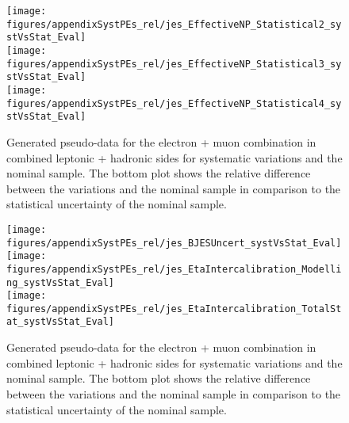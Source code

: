 \begin{figure}[!hb]
\begin{center}
        \texttt{[image: figures/appendixSystPEs\_rel/jes\_EffectiveNP\_Statistical2\_systVsStat\_Eval]}\\
        \texttt{[image: figures/appendixSystPEs\_rel/jes\_EffectiveNP\_Statistical3\_systVsStat\_Eval]}\\
        \texttt{[image: figures/appendixSystPEs\_rel/jes\_EffectiveNP\_Statistical4\_systVsStat\_Eval]}
\caption{Generated pseudo-data for the electron + muon combination in combined leptonic + hadronic sides for systematic variations and the nominal \ttbar sample. The bottom plot shows the relative difference between the variations and the nominal sample in comparison to the statistical uncertainty of the nominal sample.}   
\label{fig:systematicVar_lephad_JES_3_2}
\end{center}
\end{figure}        
\begin{figure}[!hb]
\begin{center}
        \texttt{[image: figures/appendixSystPEs\_rel/jes\_BJESUncert\_systVsStat\_Eval]}\\
        \texttt{[image: figures/appendixSystPEs\_rel/jes\_EtaIntercalibration\_Modelling\_systVsStat\_Eval]}\\
        \texttt{[image: figures/appendixSystPEs\_rel/jes\_EtaIntercalibration\_TotalStat\_systVsStat\_Eval]}
\caption{Generated pseudo-data for the electron + muon combination in combined leptonic + hadronic sides for systematic variations and the nominal \ttbar sample. The bottom plot shows the relative difference between the variations and the nominal sample in comparison to the statistical uncertainty of the nominal sample.}   
\label{fig:systematicVar_lephad_JES_4_1}
\end{center}
\end{figure}

